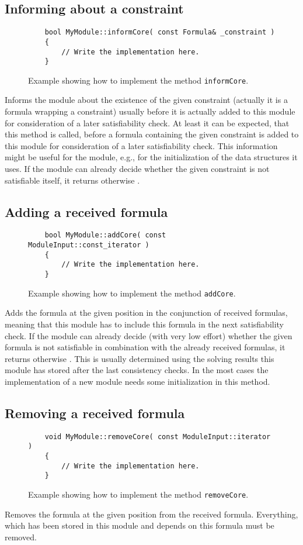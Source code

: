 \subsection{Informing about a constraint}
\begin{figure}[htb]
\label{fig:exa_inform}
\caption{Example showing how to implement the method \texttt{informCore}.}
\begin{verbatim}
	bool MyModule::informCore( const Formula& _constraint )
	{
	    // Write the implementation here.
	}
\end{verbatim}
\end{figure}
Informs the module about the existence of the given constraint (actually it is a
formula wrapping a constraint) usually before it is actually added to this module for consideration
of a later satisfiability check. At least it can be expected, that this method
is called, before a formula containing the given constraint is added 
to this module for consideration of a later satisfiability check. 
This information might be useful for the module, e.g., for the 
initialization of the data structures it uses. If the module
can already decide whether the given constraint is not satisfiable itself, it returns \false
otherwise \true.

\subsection{Adding a received formula}
\begin{figure}[htb]
\label{fig:exa_assertsubformula}
\caption{Example showing how to implement the method \texttt{addCore}.}
\begin{verbatim}
	bool MyModule::addCore( const ModuleInput::const_iterator )
	{
	    // Write the implementation here.
	}
\end{verbatim}
\end{figure}
Adds the formula at the given position in the conjunction of received formulas, meaning that this module has to include this formula
in the next satisfiability check. If the module
can already decide (with very low effort) whether the given formula is not satisfiable in combination
with the already received formulas, it returns \false otherwise \true. This is usually determined using the 
solving results this module has stored after the last consistency checks. 
In the most cases the implementation of a new module needs some initialization in this method.

\subsection{Removing a received formula}
\begin{figure}[htb]
\label{fig:exa_removesubformula}
\caption{Example showing how to implement the method \texttt{removeCore}.}
\begin{verbatim}
	void MyModule::removeCore( const ModuleInput::iterator )
	{
	    // Write the implementation here.
	}
\end{verbatim}
\end{figure}
Removes the formula at the given position from the received formula. Everything,
which has been stored in this module and depends on this formula must be removed.

